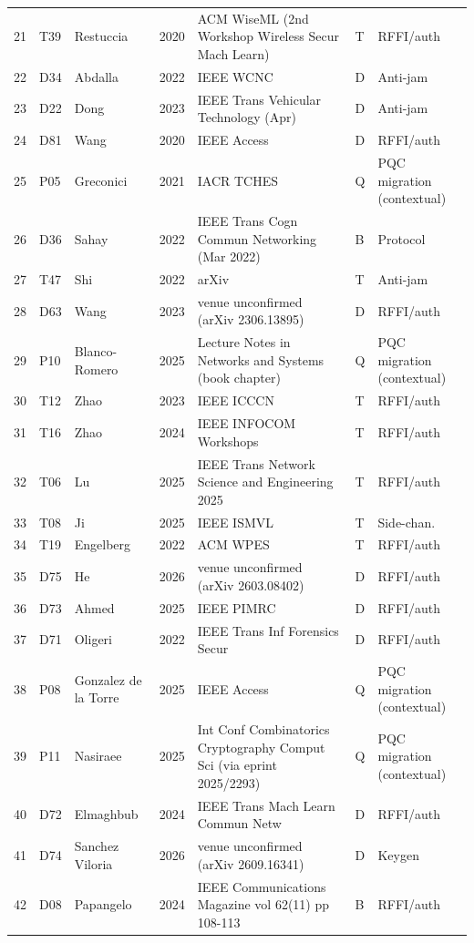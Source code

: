 \documentclass[10.5pt,compsoc,winfonts]{ICN}
\begin{document}
\begin{table}[p]
\begin{tabular}{@{}lllll>{\raggedright\arraybackslash}p{3.3cm}>{\raggedright\arraybackslash}p{1.9cm}@{}}
21 & T39 & Restuccia & 2020 & ACM WiseML (2nd Workshop Wireless Secur Mach Learn) & T & RFFI/auth \\
22 & D34 & Abdalla & 2022 & IEEE WCNC & D & Anti-jam \\
23 & D22 & Dong & 2023 & IEEE Trans Vehicular Technology (Apr) & D & Anti-jam \\
24 & D81 & Wang & 2020 & IEEE Access & D & RFFI/auth \\
25 & P05 & Greconici & 2021 & IACR TCHES & Q & PQC migration (contextual) \\
26 & D36 & Sahay & 2022 & IEEE Trans Cogn Commun Networking (Mar 2022) & B & Protocol \\
27 & T47 & Shi & 2022 & arXiv & T & Anti-jam \\
28 & D63 & Wang & 2023 & venue unconfirmed (arXiv 2306.13895) & D & RFFI/auth \\
29 & P10 & Blanco-Romero & 2025 & Lecture Notes in Networks and Systems (book chapter) & Q & PQC migration (contextual) \\
30 & T12 & Zhao & 2023 & IEEE ICCCN & T & RFFI/auth \\
31 & T16 & Zhao & 2024 & IEEE INFOCOM Workshops & T & RFFI/auth \\
32 & T06 & Lu & 2025 & IEEE Trans Network Science and Engineering 2025 & T & RFFI/auth \\
33 & T08 & Ji & 2025 & IEEE ISMVL & T & Side-chan. \\
34 & T19 & Engelberg & 2022 & ACM WPES & T & RFFI/auth \\
35 & D75 & He & 2026 & venue unconfirmed (arXiv 2603.08402) & D & RFFI/auth \\
36 & D73 & Ahmed & 2025 & IEEE PIMRC & D & RFFI/auth \\
37 & D71 & Oligeri & 2022 & IEEE Trans Inf Forensics Secur & D & RFFI/auth \\
38 & P08 & Gonzalez de la Torre & 2025 & IEEE Access & Q & PQC migration (contextual) \\
39 & P11 & Nasiraee & 2025 & Int Conf Combinatorics Cryptography Comput Sci (via eprint 2025/2293) & Q & PQC migration (contextual) \\
40 & D72 & Elmaghbub & 2024 & IEEE Trans Mach Learn Commun Netw & D & RFFI/auth \\
41 & D74 & Sanchez Viloria & 2026 & venue unconfirmed (arXiv 2609.16341) & D & Keygen \\
42 & D08 & Papangelo & 2024 & IEEE Communications Magazine vol 62(11) pp 108-113 & B & RFFI/auth \\

\end{tabular}
\end{table}
\end{document}
